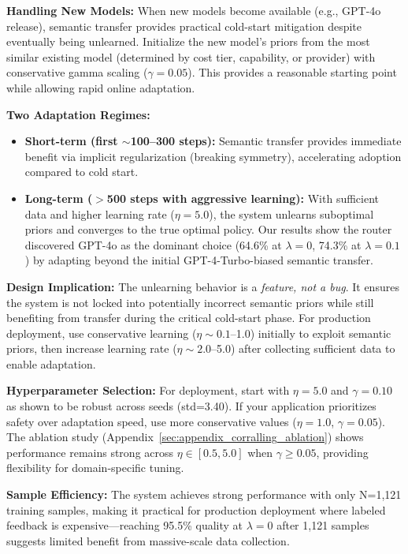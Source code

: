 \textbf{Handling New Models:} When new models become available (e.g., GPT-4o release), semantic transfer provides practical cold-start mitigation despite eventually being unlearned. Initialize the new model's priors from the most similar existing model (determined by cost tier, capability, or provider) with conservative gamma scaling ($\gamma=0.05$). This provides a reasonable starting point while allowing rapid online adaptation.

\textbf{Two Adaptation Regimes:}
\begin{itemize}[nosep]
    \item \textbf{Short-term (first $\sim$100--300 steps):} Semantic transfer provides immediate benefit via implicit regularization (breaking symmetry), accelerating adoption compared to cold start.
    \item \textbf{Long-term ($>$500 steps with aggressive learning):} With sufficient data and higher learning rate ($\eta=5.0$), the system unlearns suboptimal priors and converges to the true optimal policy. Our results show the router discovered GPT-4o as the dominant choice (64.6\% at $\lambda=0$, 74.3\% at $\lambda=0.1$) by adapting beyond the initial GPT-4-Turbo-biased semantic transfer.
\end{itemize}

\textbf{Design Implication:} The unlearning behavior is a \emph{feature, not a bug}. It ensures the system is not locked into potentially incorrect semantic priors while still benefiting from transfer during the critical cold-start phase. For production deployment, use conservative learning ($\eta \sim 0.1$--1.0) initially to exploit semantic priors, then increase learning rate ($\eta \sim 2.0$--5.0) after collecting sufficient data to enable adaptation.

\textbf{Hyperparameter Selection:} For deployment, start with $\eta=5.0$ and $\gamma=0.10$ as shown to be robust across seeds (std=3.40). If your application prioritizes safety over adaptation speed, use more conservative values ($\eta=1.0$, $\gamma=0.05$). The ablation study (Appendix~\ref{sec:appendix_corralling_ablation}) shows performance remains strong across $\eta \in [0.5, 5.0]$ when $\gamma \geq 0.05$, providing flexibility for domain-specific tuning.

\textbf{Sample Efficiency:} The system achieves strong performance with only N=1,121 training samples, making it practical for production deployment where labeled feedback is expensive---reaching 95.5\% quality at $\lambda=0$ after 1,121 samples suggests limited benefit from massive-scale data collection.


